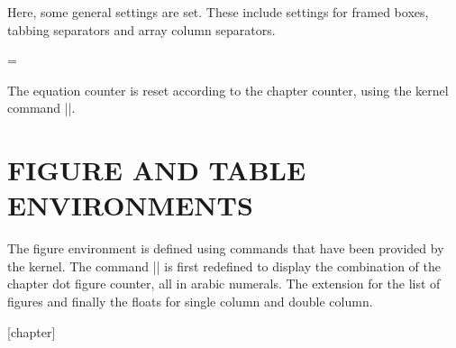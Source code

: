 \begin{multicols}{2}
 Here, some general settings are set. These include settings for framed boxes, tabbing separators and array column separators.

\end{multicols}
\begin{teX}
\setlength{}
\setlength{}
\setlength{}
\setlength{}
\setlength{}
\skip\@mpfootins = \skip\footins
\setlength{}
\setlength{}
\end{teX}

\begin{multicols}{2}
The equation counter is reset according to the chapter counter, using the \latex kernel command |\@addtoreset|. 

\end{multicols}
\begin{teX}
\renewcommand\theequation
  {\ifnum \c@chapter>\z@ \thechapter.\fi \@arabic\c@equation}
\end{teX}

\section*{FIGURE AND TABLE ENVIRONMENTS}

\begin{multicols}{2}
 The figure environment is defined using commands that have been provided by the kernel.  The command |\thefigure| is first redefined to display the combination of the chapter dot figure counter, all in arabic numerals. The extension for the list of figures and finally the floats for single column and double column.

\end{multicols}

\label{book:figure}
\begin{teX}
[chapter]
\renewcommand \thefigure
     {\ifnum \c@chapter>\z@ \thechapter.\fi \@arabic\c@figure}
\def\fps@figure{tbp}
\def\ftype@figure{1}
\def\ext@figure{lof}
\def\fnum@figure{\figurename\nobreakspace\thefigure}
\newenvironment{figure}
               {\@float{figure}}
               {\end@float}
\newenvironment{figure*}
               {\@dblfloat{figure}}
               {\end@dblfloat}
\end{teX}

